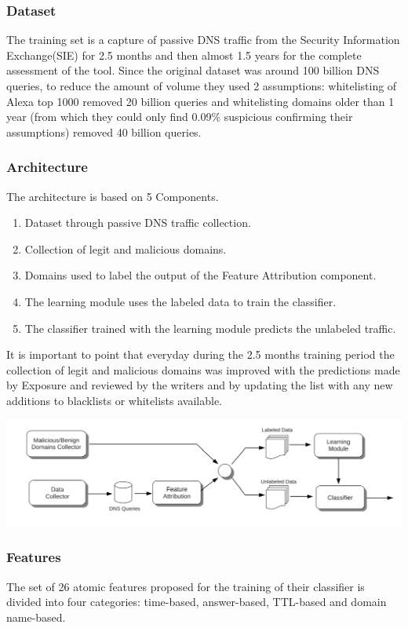 \subsubsection{Dataset}
The training set is a capture of passive DNS traffic from the Security Information Exchange(SIE) for 2.5 months and then almost 1.5 years for the complete assessment of the tool. Since the original dataset was around 100 billion DNS queries, to reduce the amount of volume they used 2 assumptions: whitelisting of Alexa top 1000  removed 20 billion queries and whitelisting domains older than 1 year (from which they could only find 0.09\% suspicious confirming their assumptions) removed 40 billion queries.
\subsubsection{Architecture}
The architecture is based on 5 Components. 
\begin{enumerate}
\item Dataset through passive DNS traffic collection.
\item Collection of legit and malicious domains.
\item Domains used to label the output of the Feature Attribution component.
\item The learning module uses the labeled data to train the classifier.
\item The classifier trained with the learning module predicts the unlabeled traffic.
\end{enumerate}
It is important to point that everyday during the 2.5 months training period the collection of legit and malicious domains was improved with the predictions made by Exposure and reviewed by the writers and by updating the list with any new additions to blacklists or whitelists available.

\includegraphics[scale=.6]{img/exposure_architecture.png}

\subsubsection{Features}
The set of 26 atomic features proposed for the training of their classifier is divided into four categories: time-based, answer-based, TTL-based and domain name-based.



